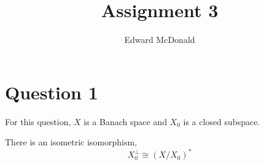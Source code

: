 \documentclass{unswmaths}
\begin{document}
\subject{Functional Analysis}
\author{Edward McDonald}
\title{Assignment 3}


\newcommand{\Real}{\operatorname{Re}}
\newcommand{\Img}{\operatorname{Im}}
\newcommand{\lan}{\langle}
\newcommand{\ran}{\rangle}
\newcommand{\Proj}{\mathbb{P}_+}
\newcommand{\isom}{\cong}
\newcommand{\id}{{\operatorname{id}}}


\unswtitle{}
\section*{Question 1}
For this question, $X$ is a Banach space and $X_0$ is a closed subspace.
\begin{lemma}
    There is an isometric isomorphism,
    \begin{equation*}
        X_0^\perp \isom (X/X_0)^*
    \end{equation*}
\end{lemma}
\end{document}
